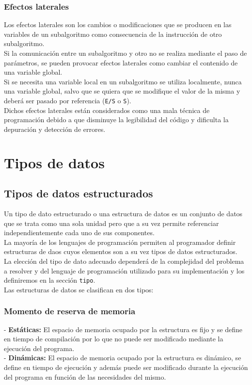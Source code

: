 \documentclass[12pt,letterpaper]{article}
\begin{document}
\subsubsection{Efectos laterales}

Los efectos laterales son los cambios o modificaciones que se producen en las variables de un subalgoritmo como consecuencia de la instrucción de otro subalgoritmo.\\
Si la comunicación entre un subalgoritmo y otro no se realiza mediante el paso de parámetros, se pueden provocar efectos laterales como cambiar el contenido de una variable global.\\
Si se necesita una variable local en un subalgoritmo se utiliza localmente, nunca una variable global, salvo que se quiera que se modifique el valor de la misma y deberá ser pasado por referencia (\texttt{E/S} o \texttt{S}).\\
Dichos efectos laterales están considerados como una mala técnica de programación debido a que disminuye la legibilidad del código y dificulta la depuración y detección de errores.

\section{Tipos de datos}
\subsection{Tipos de datos estructurados}

Un tipo de dato estructurado o una estructura de datos es un conjunto de datos que se trata como una sola unidad pero que a su vez permite referenciar independientemente cada uno de sus componentes.\\
La mayoría de los lenguajes de programación permiten al programador definir estructuras de daos cuyos elementos son a su vez tipos de datos estructurados.\\
La elección del tipo de dato adecuado dependerá de la complejidad del problema a resolver y del lenguaje de programación utilizado para su implementación y los definiremos en la sección \texttt{tipo}.\\
Las estructuras de datos se clasifican en dos tipos:

\subsubsection{Momento de reserva de memoria}
\noindent
- \textbf{Estáticas:} El espacio de memoria ocupado por la estructura es fijo y se define en tiempo de compilación por lo que no puede ser modificado mediante la ejecución del programa.\\
- \textbf{Dinámicas:} El espacio de memoria ocupado por la estructura es dinámico, se define en tiempo de ejecución y además puede ser modificado durante la ejecución del programa en función de las necesidades del mismo.
\end{document}
